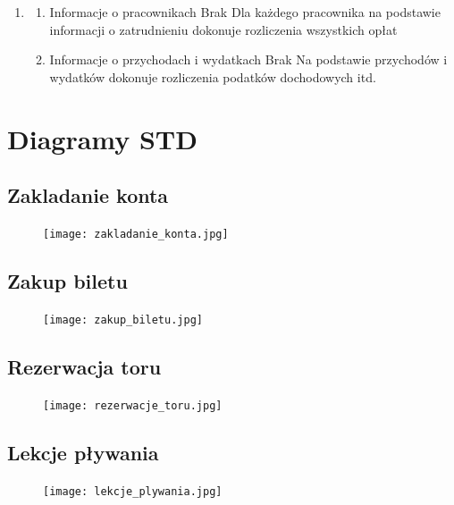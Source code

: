 \documentclass[a4paper,11pt]{article}
\begin{document}
\begin{enumerate}
\begin{enumerate}
\begin{enumerate}
                \end{enumerate}
            \item {}
                \begin{enumerate}
                    \item {} {Informacje o pracownikach} {Brak} {Dla każdego pracownika na podstawie informacji o zatrudnieniu dokonuje rozliczenia wszystkich opłat}
                    \item {} {Informacje o przychodach i wydatkach} {Brak} {Na podstawie przychodów i wydatków dokonuje rozliczenia podatków dochodowych itd.}
                \end{enumerate}
        \end{enumerate}
\end{enumerate}
\newpage


\section{Diagramy STD}
\subsection{Zakladanie konta}
    \begin{figure}[!htb]
    \centerline{\texttt{[image: zakladanie\_konta.jpg]}}
    \label{fig:zakladanie_konta}
    \end{figure}
\newpage
\subsection{Zakup biletu}
    \begin{figure}[!htb]
    \centerline{\texttt{[image: zakup\_biletu.jpg]}}
    \label{fig:zakup_biletu}
    \end{figure}
\newpage
\subsection{Rezerwacja toru}
    \begin{figure}[!htb]
    \centerline{\texttt{[image: rezerwacje\_toru.jpg]}}
    \label{fig:rezerwacje_toru}
    \end{figure}
\newpage
\subsection{Lekcje pływania}
    \begin{figure}[!htb]
    \centerline{\texttt{[image: lekcje\_plywania.jpg]}}
    \label{fig:lekcje_plywania}
    \end{figure}
\newpage
\end{document}
